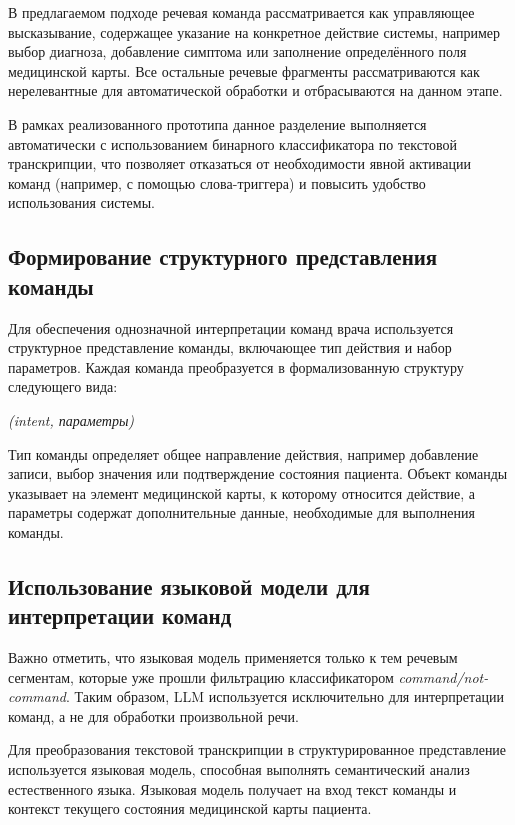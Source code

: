 В предлагаемом подходе речевая команда рассматривается как управляющее высказывание, содержащее указание на конкретное действие системы, например выбор диагноза, добавление симптома или заполнение определённого поля медицинской карты. Все остальные речевые фрагменты рассматриваются как нерелевантные для автоматической обработки и отбрасываются на данном этапе.

В рамках реализованного прототипа данное разделение выполняется автоматически с использованием бинарного классификатора по текстовой транскрипции, что позволяет отказаться от необходимости явной активации команд (например, с помощью слова-триггера) и повысить удобство использования системы.

\subsection{Формирование структурного представления команды}

Для обеспечения однозначной интерпретации команд врача используется структурное представление команды, включающее тип действия и набор параметров. Каждая команда преобразуется в формализованную структуру следующего вида:

\begin{center}
\textit{(intent, параметры)}
\end{center}

Тип команды определяет общее направление действия, например добавление записи, выбор значения или подтверждение состояния пациента. Объект команды указывает на элемент медицинской карты, к которому относится действие, а параметры содержат дополнительные данные, необходимые для выполнения команды.

\subsection{Использование языковой модели для интерпретации команд}

Важно отметить, что языковая модель применяется только к тем речевым сегментам, которые уже прошли фильтрацию классификатором \textit{command/not-command}.
Таким образом, LLM используется исключительно для интерпретации команд, а не для обработки произвольной речи.

Для преобразования текстовой транскрипции в структурированное представление используется языковая модель, способная выполнять семантический анализ естественного языка. Языковая модель получает на вход текст команды и контекст текущего состояния медицинской карты пациента.


